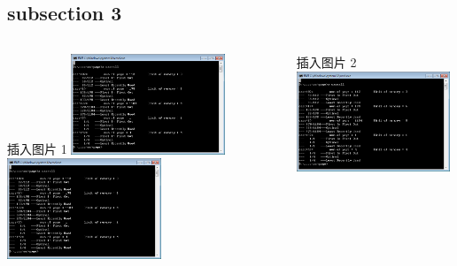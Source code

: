 \documentclass{beamer}
\begin{document}
\subsection{subsection 3}
\begin{frame}
\begin{columns}[t]
		\begin{block}{插入图片 1 }
			\includegraphics[height=3cm]{page.png}
			\newline
			\includegraphics[height=3cm]{page.png}
		\end{block}
		\begin{block}{插入图片 2 }
			\includegraphics[height=3cm]{page.png}
		\end{block}
\end{columns}
\end{frame}
\end{document}
